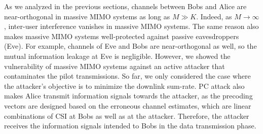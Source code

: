 \documentclass[draftclsnofoot, 12pt, onecolumn, journal]{IEEEtran}
\begin{document}
As we analyzed in the previous sections, channels between Bobs and Alice are near-orthogonal in massive MIMO systems as long as $M \gg K$.
Indeed, as $M \rightarrow \infty$, inter-user interference vanishes in massive MIMO systems.
The same reason also makes massive MIMO systems well-protected against passive eavesdroppers (Eve).
For example, channels of Eve and Bobs are near-orthogonal as well, so the mutual information leakage at Eve is negligible. 
However, we showed the vulnerability of massive MIMO systems against an active attacker that contaminates the pilot transmissions.
So far, we only considered the case where the attacker's objective is to minimize the downlink sum-rate.
PC attack also makes Alice transmit information signals towards the attacker, as the precoding vectors are designed based on the erroneous channel estimates, which are linear combinations of CSI at Bobs as well as at the attacker.
Therefore, the attacker receives the information signals intended to Bobs in the data transmission phase.

\end{document}
